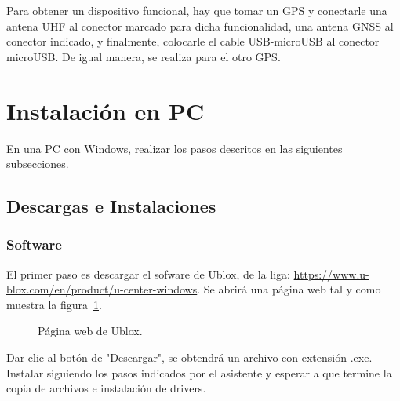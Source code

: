 Para obtener un dispositivo funcional, hay que tomar un GPS y conectarle una antena UHF al conector marcado para dicha funcionalidad, una antena GNSS al conector indicado, y finalmente, colocarle el cable USB-microUSB al conector microUSB. De igual manera, se realiza para el otro GPS.

\section{Instalación en PC}\label{sec:InstPC}
En una PC con Windows, realizar los pasos descritos en las siguientes subsecciones.

\subsection{Descargas e Instalaciones}

\subsubsection{Software}

El primer paso es descargar el sofware de Ublox, de la liga: \href{https://www.u-blox.com/en/product/u-center-windows}{https://www.u-blox.com/en/product/u-center-windows}. Se abrirá una página web tal y como muestra la figura~\ref{fig:UbloxWeb}.

\begin{figure}[H] %
\caption{Página web de Ublox.}
\label{fig:UbloxWeb}
\end{figure}

Dar clic al botón de "Descargar", se obtendrá un archivo con extensión .exe. Instalar siguiendo los pasos indicados por el asistente y esperar a que termine la copia de archivos e instalación de drivers.\\

